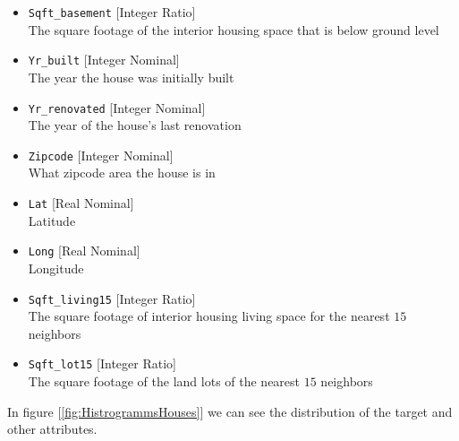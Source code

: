 \documentclass[11pt]{article}
\begin{document}
\begin{multicols}{2}
\begin{itemize}
\item \texttt{Sqft\_basement} [Integer Ratio]\\
The square footage of the interior housing space that is below ground level
\item \texttt{Yr\_built} [Integer Nominal]\\
The year the house was initially built
\item \texttt{Yr\_renovated} [Integer Nominal]\\
The year of the house's last renovation
\item \texttt{Zipcode} [Integer Nominal]\\
What zipcode area the house is in
\item \texttt{Lat} [Real Nominal]\\
Latitude 
\item \texttt{Long} [Real Nominal]\\
Longitude
\item \texttt{Sqft\_living15} [Integer Ratio]\\
The square footage of interior housing living space for the nearest $15$ neighbors
\item \texttt{Sqft\_lot15} [Integer Ratio]\\
The square footage of the land lots of the nearest $15$ neighbors
\end{itemize}
\end{multicols}
\newpage
In figure [\ref{fig:HistrogrammsHouses}] we can see the distribution of the target and other attributes.
\end{document}
